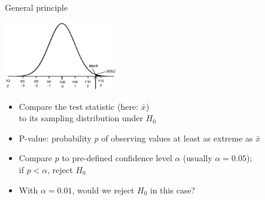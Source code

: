 \begin{frame}[c]{General principle}

\vspace*{-0.2cm}
\begin{center}
\includegraphics[height=3cm]{images/z_test_2.png}
\end{center}
\vspace*{-0.2cm}

\begin{itemize}
  \item Compare the test statistic (here: $\bar{x}$)\\to its sampling
  distribution under $H_0$
 \pause 
\medskip
  \item \alert{P-value}: probability $p$ of observing values \alert{at least as extreme as $\bar{x}$}\\
 \pause 
\medskip
  \item Compare $p$ to pre-defined confidence level $\alpha$ (usually
  $\alpha=0.05$);\\\alert{if $p < \alpha$, reject $H_0$}
 \pause 
\medskip
  \item With $\alpha = 0.01$, would we reject $H_0$ in this case? \hands
\end{itemize}

\end{frame}


